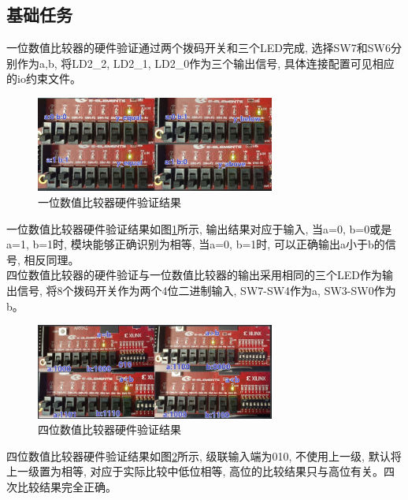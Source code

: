 \documentclass{article}
\begin{document}
\subsection*{基础任务}
一位数值比较器的硬件验证通过两个拨码开关和三个LED完成, 选择SW7和SW6分别作为a,b, 将LD2\_2, LD2\_1, LD2\_0作为三个输出信号, 
具体连接配置可见相应的io约束文件。\\
\begin{figure}[H]
    \centering
    \includegraphics[width=0.7\textwidth]{image/2024-06-14-22-19-02.png}
    \caption{一位数值比较器硬件验证结果}
    \label{image_1bit_verify}
\end{figure}
一位数值比较器硬件验证结果如图\ref{image_1bit_verify}所示, 输出结果对应于输入, 当a=0, b=0或是a=1, b=1时, 模块能够正确识别为相等, 当a=0, b=1时, 可以正确输出a小于b的信号, 相反同理。\\
四位数值比较器的硬件验证与一位数值比较器的输出采用相同的三个LED作为输出信号, 将8个拨码开关作为两个4位二进制输入, SW7-SW4作为a, SW3-SW0作为b。\\
\begin{figure}[H]
    \centering
    \includegraphics[width=0.7\textwidth]{image/2024-06-15-20-44-19.png}
    \caption{四位数值比较器硬件验证结果}
    \label{image_4bit_verify}
\end{figure}
四位数值比较器硬件验证结果如图\ref{image_4bit_verify}所示, 级联输入端为010, 不使用上一级, 默认将上一级置为相等, 对应于实际比较中低位相等, 高位的比较结果只与高位有关。四次比较结果完全正确。
\end{document}
